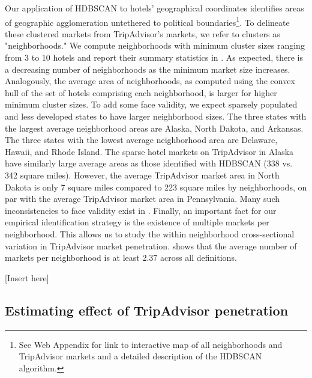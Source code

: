 \documentclass[mksc,blindrev]{informs3} %
\begin{document}
Our application of HDBSCAN to hotels' geographical coordinates identifies areas of geographic agglomeration untethered to political boundaries\footnote{See Web Appendix for link to interactive map of all neighborhoods and TripAdvisor markets and a detailed description of the HDBSCAN algorithm.}. To delineate these clustered markets from TripAdvisor's markets, we refer to clusters as "neighborhoods." We compute neighborhoods with minimum cluster sizes ranging from 3 to 10 hotels and report their summary statistics in . As expected, there is a decreasing number of neighborhoods as the minimum market size increases. Analogously, the average area of neighborhoods, as computed using the convex hull of the set of hotels comprising each neighborhood, is larger for higher minimum cluster sizes. To add some face validity, we expect sparsely populated and less developed states to have larger neighborhood sizes. The three states with the largest average neighborhood areas are Alaska, North Dakota, and Arkansas. The three states with the lowest average neighborhood area are Delaware, Hawaii, and Rhode Island. The sparse hotel markets on TripAdvisor in Alaska have similarly large average areas as those identified with HDBSCAN (338 vs. 342 square miles). However, the average TripAdvisor market area in North Dakota is only 7 square miles compared to 223 square miles by neighborhoods, on par with the average TripAdvisor market area in Pennsylvania. Many such inconsistencies to face validity exist in . Finally, an important fact for our empirical identification strategy is the existence of multiple markets per neighborhood. This allows us to study the within neighborhood cross-sectional variation in TripAdvisor market penetration.  shows that the average number of markets per neighborhood is at least 2.37 across all definitions.

[Insert  here]

\subsection{Estimating effect of TripAdvisor penetration}
\end{document}
